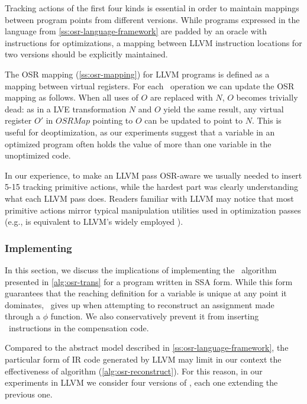Tracking actions of the first four kinds is essential in order to maintain mappings between program points from different versions.
While programs expressed in the language from \mysection\ref{ss:osr-language-framework} are padded by an oracle with  instructions for optimizations, a mapping between LLVM instruction locations for two versions should be explicitly maintained.

The OSR mapping (\mysection\ref{ss:osr-mapping}) for LLVM programs is defined as a mapping between virtual registers. For each \RAUWfull\ operation we can update the OSR mapping as follows. When all uses of $O$ are replaced with $N$, $O$ becomes trivially dead: as in a LVE transformation $N$ and $O$ yield the same result, any virtual register $O'$ in $OSRMap$ pointing to $O$ can be updated to point to $N$. This is useful for deoptimization, as our experiments suggest that a variable in an optimized program often holds the value of more than one variable in the unoptimized code.

In our experience, to make an LLVM pass OSR-aware we usually needed to insert 5-15 tracking primitive actions, while the hardest part was clearly understanding what each LLVM pass does. Readers familiar with LLVM may notice that most primitive actions mirror typical manipulation utilities used in optimization passes (e.g.,  is equivalent to LLVM's widely employed ).

\subsubsection*{Implementing }

In this section, we discuss the implications of implementing the \buildcomp\ algorithm presented in \myalgorithm\ref{alg:osr-trans} for a program written in SSA form. While this form guarantees that the reaching definition for a variable is unique at any point it dominates, \reconstruct\ gives up when attempting to reconstruct an assignment made through a $\phi$ function. We also conservatively prevent it from inserting \load\ instructions in the compensation code. 

Compared to the abstract model described in \mysection\ref{ss:osr-language-framework}, the particular form of IR code generated by LLVM may limit in our context the effectiveness of algorithm \reconstruct(\myalgorithm\ref{alg:osr-reconstruct}). For this reason, in our experiments in LLVM we consider four versions of \reconstruct, each one extending the previous one.

